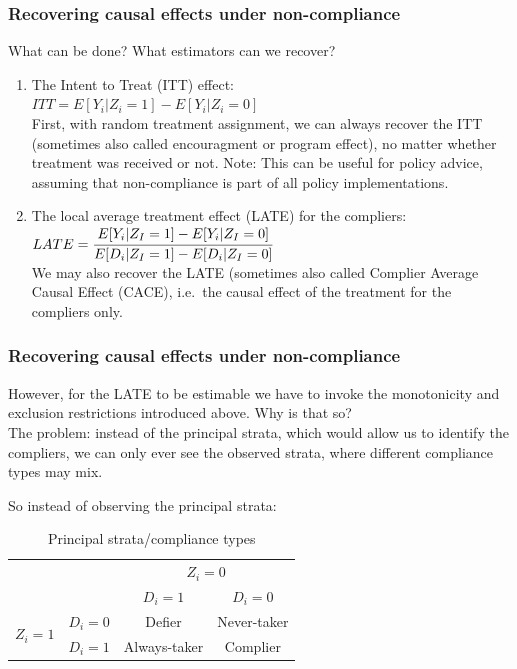\documentclass[12pt,english,dvipsnames,aspectratio=169,handout]{beamer}\usepackage[]{graphicx}\usepackage[]{xcolor}
\begin{document}
\begin{frame}
\frametitle{Recovering causal effects under non-compliance}
What can be done? What estimators can we recover?

\begin{enumerate} \footnotesize
  \item The Intent to Treat (ITT) effect: \\ $ITT=E[Y_{i}|Z_i=1] - E[Y_{i}|Z_i=0]$\\ \vspace{1mm}\scriptsize
  First, with random treatment assignment, we can always recover the ITT (sometimes also called encouragment or program effect), no matter whether treatment was received or not. Note: This can be useful for policy advice, assuming that non-compliance is part of all policy implementations. \footnotesize \vspace{1mm}

  \item  The local average treatment effect (LATE) for the compliers:\\
  $LATE=\cfrac{E[Y_i|Z_I=1]-E[Y_i|Z_I=0]}{E[D_i|Z_I=1]-E[D_i|Z_I=0]}$\\ \vspace{1mm}\scriptsize
  We may also recover the LATE (sometimes also called Complier Average Causal Effect (CACE), i.e.\ the causal effect of the treatment for the compliers only. 
  \end{enumerate}
\end{frame}



\begin{frame}
\frametitle{Recovering causal effects under non-compliance}
\footnotesize
However, for the LATE to be estimable we have to invoke the monotonicity and exclusion restrictions introduced above. Why is that so? \\
\vspace{2mm}
The problem: instead of the principal strata, which would allow us to identify the compliers, we can only ever see the observed strata, where different compliance types may mix. 

So instead of observing the principal strata:

\begin{table}\centering\footnotesize
\begin{tabular}{cccc}
\hline
                         &         & \multicolumn{2}{c}{$Z_i=0$} \\
                         &         & $D_i=1$      & $D_i=0$ \\ 
\hline
\multirow{2}{*}{$Z_i=1$} & $D_i=0$ & Defier                   & Never-taker \\
                         & $D_i=1$ & Always-taker       &  Complier  \\
\hline
\end{tabular}
\caption{\scriptsize Principal strata/compliance types}
\end{table}
\end{frame}
\end{document}
